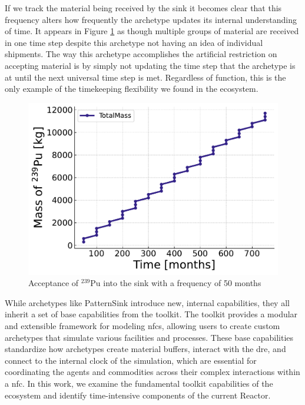 If we track the material being received by the sink it becomes clear that this
frequency alters how frequently the archetype updates its internal
understanding of time. It appears in Figure \ref{fig:pattern_freq_50} as though
multiple groups of material are received in one time step despite this
archetype not having an idea of individual shipments. The way this archetype
accomplishes the artificial restriction on accepting material is by simply not
updating the time step that the archetype is at until the next universal time
step is met. Regardless of function, this is the only example of the
timekeeping flexibility we found in the ecosystem.

\begin{figure}[H]
    \centering
    \includegraphics[scale=0.7]{images/cyclus/pattern_sink_fuel_transactions.pdf}
    \caption{Acceptance of $^{239}$Pu into the sink with a frequency of 50 months}
    \label{fig:pattern_freq_50}
\end{figure}

While archetypes like PatternSink introduce new, internal capabilities, they
all inherit a set of base capabilities from the \cyclus toolkit. The \cyclus
toolkit provides a modular and extensible framework for modeling \glspl{nfc},
allowing users to create custom archetypes that simulate various facilities and
processes. These base capabilities standardize how archetypes create material
buffers, interact with the \gls{dre}, and connect to the internal clock of the
simulation, which are essential for coordinating the agents and commodities
across their complex interactions within a \gls{nfc}. In this work, we examine
the fundamental toolkit capabilities of the \cyclus ecosystem and identify
time-intensive components of the current \cycamore Reactor.

